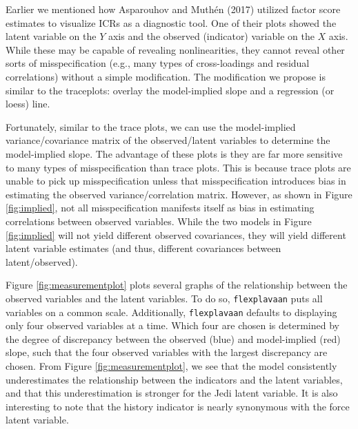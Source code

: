 \documentclass[
  english,
  doc]{apa6}
\begin{document}
Earlier we mentioned how Asparouhov and Muthén (2017) utilized factor score estimates to visualize ICRs as a diagnostic tool. One of their plots showed the latent variable on the \(Y\) axis and the observed (indicator) variable on the \(X\) axis. While these may be capable of revealing nonlinearities, they cannot reveal other sorts of misspecification (e.g., many types of cross-loadings and residual correlations) without a simple modification. The modification we propose is similar to the traceplots: overlay the model-implied slope and a regression (or loess) line.

Fortunately, similar to the trace plots, we can use the model-implied variance/covariance matrix of the observed/latent variables to determine the model-implied slope. The advantage of these plots is they are far more sensitive to many types of misspecification than trace plots. This is because trace plots are unable to pick up misspecification unless that misspecification introduces bias in estimating the observed variance/correlation matrix. However, as shown in Figure \ref{fig:implied}, not all misspecification manifests itself as bias in estimating correlations between observed variables. While the two models in Figure \ref{fig:implied} will not yield different observed covariances, they will yield different latent variable estimates (and thus, different covariances between latent/observed).

Figure \ref{fig:measurementplot} plots several graphs of the relationship between the observed variables and the latent variables. To do so, \texttt{flexplavaan} puts all variables on a common scale. Additionally, \texttt{flexplavaan} defaults to displaying only four observed variables at a time. Which four are chosen is determined by the degree of discrepancy between the observed (blue) and model-implied (red) slope, such that the four observed variables with the largest discrepancy are chosen. From Figure \ref{fig:measurementplot}, we see that the model consistently underestimates the relationship between the indicators and the latent variables, and that this underestimation is stronger for the Jedi latent variable. It is also interesting to note that the history indicator is nearly synonymous with the force latent variable.
\end{document}
